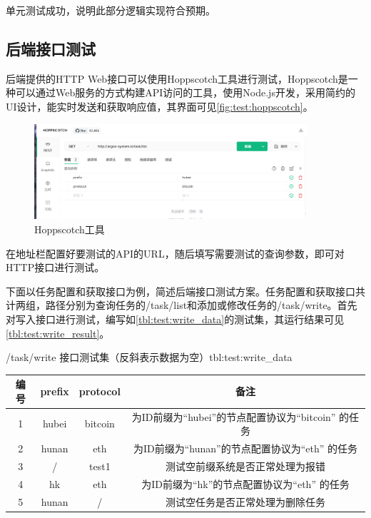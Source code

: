 \documentclass[supercite]{HustGraduPaper}
\newcommand{\xfig}[3]{
  \begin{figure}[htb]
    \centering
    #3
    \caption{#2}
    \label{fig:#1}
  \end{figure}
}
\newcommand{\rfig}[1]{\autoref{fig:#1}}
\newcommand{\rtbl}[1]{\autoref{tbl:#1}}
\theoremstyle{definition}
\begin{document}
单元测试成功，说明此部分逻辑实现符合预期。

\subsection{后端接口测试}

后端提供的HTTP Web接口可以使用Hoppscotch工具进行测试，Hoppscotch是一种可以通过Web服务的方式构建API访问的工具，使用Node.js开发，采用简约的UI设计，能实时发送和获取响应值，其界面可见\rfig{test:hoppscotch}。

\xfig{test:hoppscotch}{Hoppscotch工具}{
  \includegraphics[width=0.9\textwidth]{images/5.2-hoppscotch.png}
}

在地址栏配置好要测试的API的URL，随后填写需要测试的查询参数，即可对HTTP接口进行测试。

下面以任务配置和获取接口为例，简述后端接口测试方案。任务配置和获取接口共计两组，路径分别为查询任务的/task/list和添加或修改任务的/task/write。首先对写入接口进行测试，编写如\rtbl{test:write_data}的测试集，其运行结果可见\rtbl{test:write_result}。

\begin{generaltab}{/task/write 接口测试集（反斜表示数据为空）}{tbl:test:write_data}
  \begin{tabular}{c|ccc}
    \toprule
    编号      & prefix & protocol       & 备注\\
    \midrule
    1        & hubei  &	bitcoin	& 为ID前缀为“hubei”的节点配置协议为“bitcoin” 的任务  \\
    2        & hunan  &	eth     & 为ID前缀为“hunan”的节点配置协议为“eth” 的任务 \\
    3        &   /    & test1   &	测试空前缀系统是否正常处理为报错\\
    4        & hk     & eth     &	为ID前缀为“hk”的节点配置协议为“eth” 的任务\\
    5        & hunan  & /       &	测试空任务是否正常处理为删除任务\\
    \bottomrule
  \end{tabular}
\end{generaltab}
\end{document}
